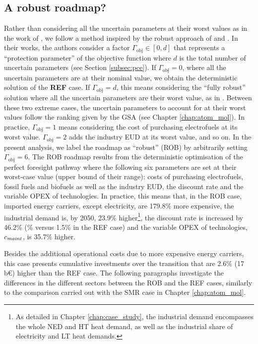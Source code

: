 \subsection{A robust roadmap?}
\label{subsec:RobPol:Rob_roadmap}
Rather than considering all the uncertain parameters at their worst values as in the work of \citet{soyster1973convex}, we follow a method inspired by the robust approach of \citet{bertsimas2004price} and \citet{Moret2017PhDThesis}. In their works, the authors consider a factor $\Gamma_{\text{obj}}\in [0,d]$ that represents a ``protection parameter'' of the objective function where $d$ is the total number of uncertain parameters (see Section \ref{subsec:pce}). If $\Gamma_{\text{obj}}= 0$, where all the uncertain parameters are at their nominal value, we obtain the deterministic solution of the \textbf{REF} case. If $\Gamma_{\text{obj}}= d$, this means considering the ``fully robust'' solution where all the uncertain parameters are their worst value, as in \citet{soyster1973convex}.  Between these two extreme cases, the uncertain parameters to account for at their worst values follow the ranking given by the \gls{GSA} (see Chapter \ref{chap:atom_mol}). In practice, $\Gamma_{\text{obj}}= 1$ means considering the cost of purchasing electrofuels at its worst value. $\Gamma_{\text{obj}}= 2$ adds the industry \gls{EUD} at its worst value, and so on. In the present analysis, we label the roadmap as ``robust'' (ROB) by arbitrarily setting $\Gamma_{\text{obj}}= 6$. The ROB roadmap results from the deterministic optimisation of the perfect foresight pathway where the following six parameters are set at their worst-case value (upper bound of their range): costs of purchasing electrofuels, fossil fuels and biofuels as well as the industry \gls{EUD}, the discount rate and the variable OPEX of technologies. In practice, this means that, in the ROB case, imported energy carriers, except electricity, are 179.8\% more expensive, the industrial demand is, by 2050, 23.9\% higher\footnote{As detailed in Chapter \ref{chap:case_study}, the industrial demand encompasses the whole \gls{NED} and \gls{HT} heat demand, as well as the industrial share of electricity and \gls{LT} heat demands.}, the discount rate is increased by 46.2\% (\% versus 1.5\% in the REF case) and the variable OPEX of technologies, $c_{\text{\emph{maint}}}$, is 35.7\% higher. 

Besides the additional operational costs due to more expensive energy carriers, this case presents cumulative investments over the transition that are 2.6\% (17\,b€) higher than the REF case. The following paragraphs investigate the differences in the different sectors between the ROB and the REF cases, similarly to the comparison carried out with the SMR case in Chapter \ref{chap:atom_mol}.\\

